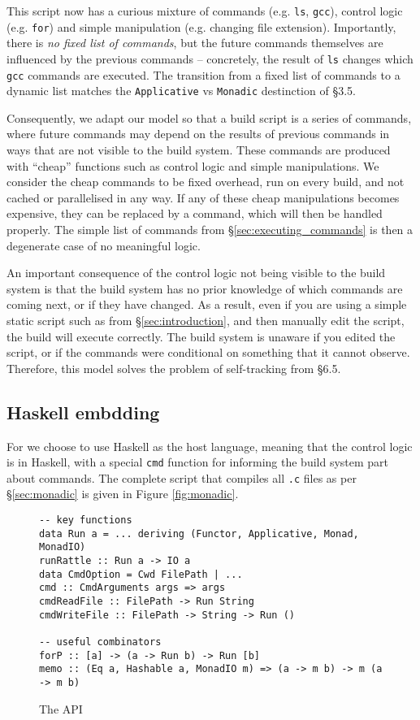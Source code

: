 This script now has a curious mixture of commands (e.g. \texttt{ls}, \texttt{gcc}), control logic (e.g. \texttt{for}) and simple manipulation (e.g. changing file extension). Importantly, there is \emph{no fixed list of commands}, but the future commands themselves are influenced by the previous commands -- concretely, the result of \texttt{ls} changes which \texttt{gcc} commands are executed. The transition from a fixed list of commands to a dynamic list matches the \texttt{Applicative} vs \texttt{Monadic} destinction of \citet{build_systems_a_la_carte} \S3.5.

Consequently, we adapt our model so that a build script is a series of commands, where future commands may depend on the results of previous commands in ways that are not visible to the build system. These commands are produced with ``cheap'' functions such as control logic and simple manipulations. We consider the cheap commands to be fixed overhead, run on every build, and not cached or parallelised in any way. If any of these cheap manipulations becomes expensive, they can be replaced by a command, which will then be handled properly. The simple list of commands from \S\ref{sec:executing_commands} is then a degenerate case of no meaningful logic.

An important consequence of the control logic not being visible to the build system is that the build system has no prior knowledge of which commands are coming next, or if they have changed. As a result, even if you are using a simple static script such as from \S\ref{sec:introduction}, and then manually edit the script, the build will execute correctly. The build system is unaware if you edited the script, or if the commands were conditional on something that it cannot observe. Therefore, this model solves the problem of self-tracking from \citet{build_systems_a_la_carte} \S6.5.

\subsection{Haskell embdding}
\label{sec:haskell}

For \Rattle we choose to use Haskell as the host language, meaning that the control logic is in Haskell, with a special \texttt{cmd} function for informing the build system part about commands. The complete \Rattle script that compiles all \texttt{.c} files as per \S\ref{sec:monadic} is given in Figure \ref{fig:monadic}.

\begin{figure}
\begin{verbatim}
-- key functions
data Run a = ... deriving (Functor, Applicative, Monad, MonadIO)
runRattle :: Run a -> IO a
data CmdOption = Cwd FilePath | ...
cmd :: CmdArguments args => args
cmdReadFile :: FilePath -> Run String
cmdWriteFile :: FilePath -> String -> Run ()

-- useful combinators
forP :: [a] -> (a -> Run b) -> Run [b]
memo :: (Eq a, Hashable a, MonadIO m) => (a -> m b) -> m (a -> m b)
\end{verbatim}
\caption{The \Rattle API}
\label{fig:api}
\end{figure}

